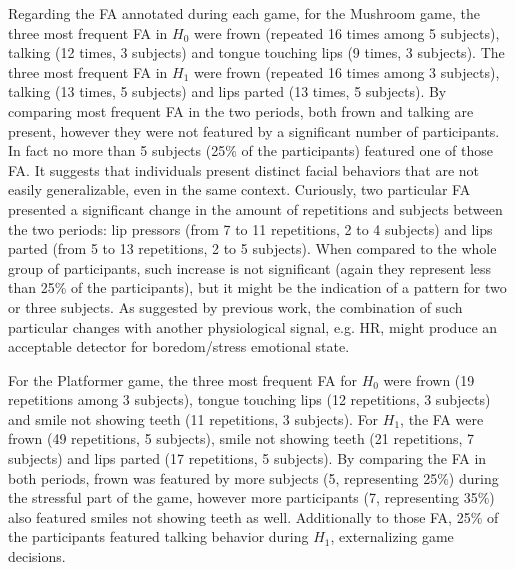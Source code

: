 Regarding the FA annotated during each game, for the Mushroom game, the three most frequent FA in $H_0$ were frown (repeated 16 times among 5 subjects), talking (12 times, 3 subjects) and tongue touching lips (9 times, 3 subjects). The three most frequent FA in $H_1$ were frown (repeated 16 times among 3 subjects), talking (13 times, 5 subjects) and lips parted (13 times, 5 subjects). By comparing most frequent FA in the two periods, both frown and talking are present, however they were not featured by a significant number of participants. In fact no more than 5 subjects (25\% of the participants) featured one of those FA. It suggests that individuals present distinct facial behaviors that are not easily generalizable, even in the same context. Curiously, two particular FA presented a significant change in the amount of repetitions and subjects between the two periods: lip pressors (from 7 to 11 repetitions, 2 to 4 subjects) and lips parted (from 5 to 13 repetitions, 2 to 5 subjects). When compared to the whole group of participants, such increase is not significant (again they represent less than 25\% of the participants), but it might be the indication of a pattern for two or three subjects. As suggested by previous work, the combination of such particular changes with another physiological signal, e.g. HR, might produce an acceptable detector for boredom/stress emotional state.

For the Platformer game, the three most frequent FA for $H_0$ were frown (19 repetitions among 3 subjects), tongue touching lips (12 repetitions, 3 subjects) and smile not showing teeth (11 repetitions, 3 subjects). For $H_1$, the FA were frown (49 repetitions, 5 subjects), smile not showing teeth (21 repetitions, 7 subjects) and lips parted (17 repetitions, 5 subjects). By comparing the FA in both periods, frown was featured by more subjects (5, representing 25\%) during the stressful part of the game, however more participants (7, representing 35\%) also featured smiles not showing teeth as well. Additionally to those FA, 25\% of the participants featured talking behavior during $H_1$, externalizing game decisions.

